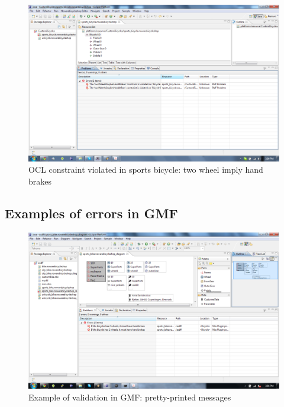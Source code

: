 \begin{figure}[H]
    \begin{center}
        \includegraphics[width=\textwidth]{fig/ocl_examples/ocl_sports_bicycle_wheel_constraint_errors.pdf}
        \caption{OCL constraint violated in sports bicycle: two wheel imply
        hand brakes}
        \label{fig.ocl_ecore_handbreaks}
    \end{center}
\end{figure}

\subsection{Examples of errors in GMF}

\begin{figure}[H]
    \begin{center}
        \includegraphics[width=\textwidth]{fig/gmf/validation/validation_example.pdf}
        \caption{Example of validation in GMF: pretty-printed messages}
        \label{fig.gmf_validation}
    \end{center}
\end{figure}
